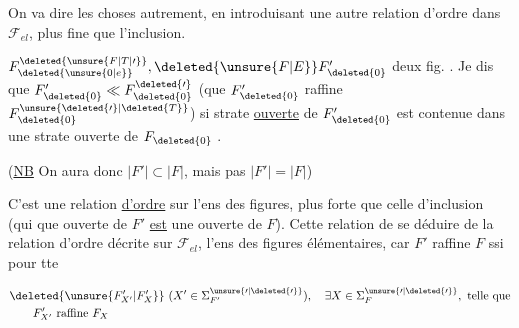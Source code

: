 
On va dire les choses autrement, en introduisant une autre relation d'ordre dans $\mathcal{F}_{el}$, plus fine que l'inclusion.


 $F_{\deleted{\unsure{0|e}}}^{\deleted{\unsure{F|T|\prime}}},\deleted{\unsure{F|E}}F_{\deleted{0}}'$ deux fig. . Je dis que $F_{\deleted{0}}'\ll F_{\deleted{0}}^{\deleted{\prime}}$ (que $F_{\deleted{0}}'$ raffine $F_{\deleted{0}}^{\unsure{\deleted{\prime}|\deleted{T}}}$) si   strate \uline{ouverte} de $F_{\deleted{0}}'$ est contenue dans une strate ouverte de $F_{\deleted{0}}$ .

(\uline{NB} On aura  donc $|F'|\subset|F|$, mais pas  $|F'|=|F|$)

C'est une relation \uline{d'ordre} sur l'ens des figures, plus forte que celle d'inclusion (qui   que   ouverte de $F'$ \uline{est} une  ouverte de $F$). Cette relation de    se déduire  de la relation d'ordre  décrite sur $\mathcal{F}_{el}$, l'ens des figures élémentaires, car $F'$ raffine $F$ ssi pour tte

\[
\begin{aligned}
&\deleted{\unsure{F'_{X'}|F'_{X}}}\ (X'\in{\Sigma}^{\unsure{\prime|\deleted{\prime}}}_{F'}),\quad \exists X\in\Sigma^{\unsure{\prime|\deleted{\prime}}}_F,\ \text{telle que}\\
&\qquad F'_{X'}\ \text{raffine}\ F_X
\end{aligned}
\]
